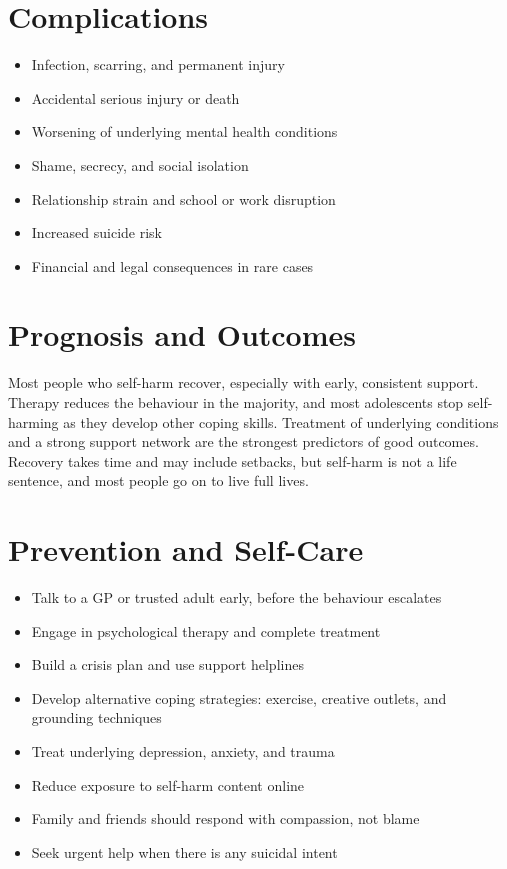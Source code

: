 \section*{Complications}
\begin{itemize}
    \item Infection, scarring, and permanent injury
    \item Accidental serious injury or death
    \item Worsening of underlying mental health conditions
    \item Shame, secrecy, and social isolation
    \item Relationship strain and school or work disruption
    \item Increased suicide risk
    \item Financial and legal consequences in rare cases
\end{itemize}

\section*{Prognosis and Outcomes}
Most people who self-harm recover, especially with early, consistent support. Therapy reduces the behaviour in the majority, and most adolescents stop self-harming as they develop other coping skills. Treatment of underlying conditions and a strong support network are the strongest predictors of good outcomes. Recovery takes time and may include setbacks, but self-harm is not a life sentence, and most people go on to live full lives.

\section*{Prevention and Self-Care}
\begin{itemize}
    \item Talk to a GP or trusted adult early, before the behaviour escalates
    \item Engage in psychological therapy and complete treatment
    \item Build a crisis plan and use support helplines
    \item Develop alternative coping strategies: exercise, creative outlets, and grounding techniques
    \item Treat underlying depression, anxiety, and trauma
    \item Reduce exposure to self-harm content online
    \item Family and friends should respond with compassion, not blame
    \item Seek urgent help when there is any suicidal intent
\end{itemize}

